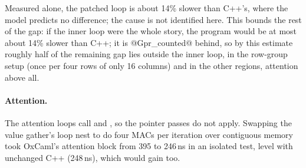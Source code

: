 Measured alone, the patched loop is about 14\% slower than C++'s, where the
model predicts no difference; the cause is not identified here. This bounds
the rest of the gap: if the inner loop were the whole story, the program would
be at most about 14\% slower than C++; it is @G{pr_counted}@ behind, so
by this estimate roughly half of the remaining gap lies outside the inner
loop, in the
row-group setup (once per four rows of only 16 columns) and in the other
regions, attention above all.

\paragraph{Attention.} The attention loops call  and
, so the pointer passes do not apply. Swapping the value
gather's loop nest to do four MACs per iteration over contiguous memory took
OxCaml's attention block from 395 to 246\,ns in an isolated test, level with
unchanged C++ (248\,ns), which would gain too.
